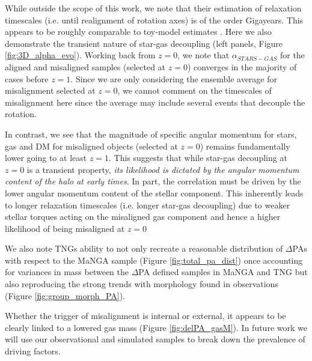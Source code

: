 \documentclass[fleqn,usenatbib]{mnras}
\begin{document}
While outside the scope of this work, we note that their estimation of relaxation timescales (i.e. until realignment of rotation axes) is of the order Gigayears. This appears to be roughly comparable to toy-model estimates \citep[see;][albeit for ETGs]{davis2016}. Here we also demonstrate the transient nature of star-gas decoupling (left panels, Figure \ref{fig:3D_alpha_evo}). Working back from $z=0$, we note that $\alpha_{STARS - GAS}$ for the aligned and misaligned samples (selected at $z=0$) converges in the majority of cases before $z=1$. Since we are only considering the ensemble average for misalignment selected at $z=0$, we cannot comment on the timescales of misalignment here since the average may include several events that decouple the rotation.

In contrast, we see that the magnitude of specific angular momentum for stars, gas and DM for misaligned objects (selected at $z=0$) remains fundamentally lower going to at least $z=1$. This suggests that while star-gas decoupling at $z=0$ is a transient property, \textit{its likelihood is dictated by the angular momentum content of the halo at early times}. In part, the correlation must be driven by the lower angular momentum content of the stellar component. This inherently leads to longer relaxation timescales (i.e. longer star-gas decoupling) due to weaker stellar torques acting on the misaligned gas component and hence a higher likelihood of being misaligned at $z=0$

We also note TNGs ability to not only recreate a reasonable distribution of $\Delta$PAs with respect to the MaNGA sample (Figure \ref{fig:total_pa_dist}) once accounting for variances in mass between the $\Delta$PA defined samples in MaNGA and TNG but also reproducing the strong trends with morphology found in observations (Figure \ref{fig:group_morph_PA}). 

Whether the trigger of misalignment is internal or external, it appears to be clearly linked to a lowered gas mass (Figure \ref{fig:delPA_gasM}). In future work we will use our observational and simulated samples to break down the prevalence of driving factors. 
\end{document}

